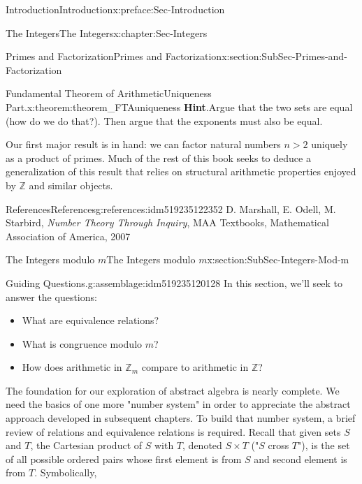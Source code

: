 \documentclass[oneside,10pt,]{book}
\newcommand{\blocktitlefont}{\relax}
\numberwithin{equation}{section}
\def\Z{{\mathbb Z}}
\begin{document}
\begin{preface}{Introduction}{}{Introduction}{}{}{x:preface:Sec-Introduction}
\begin{chapterptx}{The Integers}{}{The Integers}{}{}{x:chapter:Sec-Integers}
\begin{sectionptx}{Primes and Factorization}{}{Primes and Factorization}{}{}{x:section:SubSec-Primes-and-Factorization}
\begin{theorem}{Fundamental Theorem of Arithmetic\textendash{}Uniqueness Part.}{}{x:theorem:theorem_FTAuniqueness}
\textbf{\blocktitlefont Hint}.\quad{}Argue that the two sets are equal (how do we do that?). Then argue that the exponents must also be equal.%
\end{theorem}
Our first major result is in hand: we can factor natural numbers \(n > 2\) uniquely as a product of primes. Much of the rest of this book seeks to deduce a generalization of this result that relies on structural arithmetic properties enjoyed by \(\Z\) and similar objects.%
%
%
\typeout{************************************************}
\typeout{************************************************}
%
\begin{references-subsection-numberless}{References}{}{References}{}{}{g:references:idm519235122352}
D. Marshall, E. Odell, M. Starbird, \emph{Number Theory Through Inquiry}, MAA Textbooks, Mathematical Association of America, 2007\end{references-subsection-numberless}
\end{sectionptx}
%
%
\typeout{************************************************}
\typeout{************************************************}
%
\begin{sectionptx}{The Integers modulo \(m\)}{}{The Integers modulo \(m\)}{}{}{x:section:SubSec-Integers-Mod-m}
\begin{assemblage}{Guiding Questions.}{g:assemblage:idm519235120128}%
In this section, we'll seek to answer the questions: %
\begin{itemize}[label=\textbullet]
\item{}What are equivalence relations?%
\item{}What is congruence modulo \(m\)?%
\item{}How does arithmetic in \(\Z_m\) compare to arithmetic in \(\Z\)?%
\end{itemize}
%
\end{assemblage}
The foundation for our exploration of abstract algebra is nearly complete. We need the basics of one more "number system" in order to appreciate the abstract approach developed in subsequent chapters. To build that number system, a brief review of relations and equivalence relations is required. Recall that given sets \(S\) and \(T\), the Cartesian product of \(S\) with \(T\), denoted \(S\times T\) ("\(S\) cross \(T\)"), is the set of all possible ordered pairs whose first element is from \(S\) and second element is from \(T\). Symbolically,%
%
\begin{equation*}

\end{equation*}
\end{sectionptx}
\end{chapterptx}
\end{preface}
\end{document}
